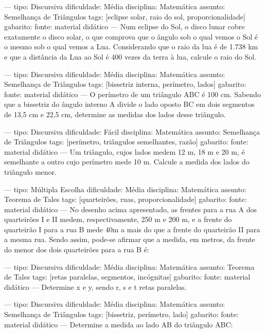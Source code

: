 ---
tipo: Discursiva
dificuldade: Média
disciplina: Matemática
assunto: Semelhança de Triângulos
tags: [eclipse solar, raio do sol, proporcionalidade]
gabarito:
fonte: material didático
---
\question
Num eclipse do Sol, o disco lunar cobre exatamente o disco solar, o que comprova que o ângulo sob o qual vemos o Sol é o mesmo sob o qual vemos a Lua. Considerando que o raio da lua é de 1.738 km e que a distância da Lua ao Sol é 400 vezes da terra à lua, calcule o raio do Sol.

---
tipo: Discursiva
dificuldade: Média
disciplina: Matemática
assunto: Semelhança de Triângulos
tags: [bissetriz interna, perímetro, lados]
gabarito:
fonte: material didático
---
\question
O perímetro de um triângulo ABC é 100 cm. Sabendo que a bissetriz do ângulo interno A divide o lado oposto BC em dois segmentos de 13,5 cm e 22,5 cm, determine as medidas dos lados desse triângulo.

---
tipo: Discursiva
dificuldade: Fácil
disciplina: Matemática
assunto: Semelhança de Triângulos
tags: [perímetro, triângulos semelhantes, razão]
gabarito:
fonte: material didático
---
\question
Um triângulo, cujos lados medem 12 m, 18 m e 20 m, é semelhante a outro cujo perímetro mede 10 m. Calcule a medida dos lados do triângulo menor.

---
tipo: Múltipla Escolha
dificuldade: Média
disciplina: Matemática
assunto: Teorema de Tales
tags: [quarteirões, ruas, proporcionalidade]
gabarito:
fonte: material didático
---
\question
No desenho acima apresentado, as frentes para a rua A dos quarteirões I e II medem, respectivamente, 250 m e 200 m, e a frente do quarteirão I para a rua B mede 40m a mais do que a frente do quarteirão II para a mesma rua. Sendo assim, pode-se afirmar que a medida, em metros, da frente do menor dos dois quarteirões para a rua B é:
\begin{choices}
\end{choices}


---
tipo: Discursiva
dificuldade: Média
disciplina: Matemática
assunto: Teorema de Tales
tags: [retas paralelas, segmentos, incógnitas]
gabarito:
fonte: material didático
---
\question
Determine x e y, sendo r, s e t retas paralelas.


---
tipo: Discursiva
dificuldade: Média
disciplina: Matemática
assunto: Semelhança de Triângulos
tags: [bissetriz, perímetro, lado]
gabarito:
fonte: material didático
---
\question
Determine a medida ao lado AB do triângulo ABC:

